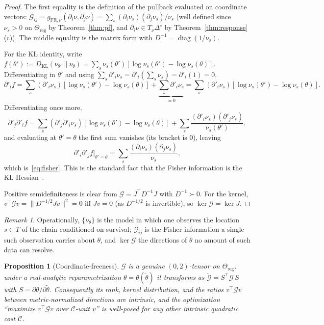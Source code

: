 \documentclass[11pt,reqno]{amsart}
\theoremstyle{plain}
\newtheorem{proposition}[theorem]{Proposition}
\theoremstyle{definition}
\theoremstyle{remark}
\newtheorem{remark}[theorem]{Remark}
\newcommand{\Reg}{\Theta_{\mathrm{reg}}}
\newcommand{\Simp}{\Delta^{\!\circ}}
\newcommand{\KL}{D_{\mathrm{KL}}}
\newcommand{\FR}{\mathrm{FR}}
\DeclareMathOperator{\diag}{diag}
\begin{document}
\begin{proof}
The first equality is the definition of the pullback evaluated on coordinate
vectors: $\mathcal G_{ij}=g_{\FR,\nu}(\partial_i\nu,\partial_j\nu)=\sum_s
(\partial_i\nu_s)(\partial_j\nu_s)/\nu_s$ (well defined since $\nu_s>0$ on $\Reg$ by
Theorem~\ref{thm:pf}, and $\partial_i\nu\in T_\nu\Simp$ by
Theorem~\ref{thm:response}(c)). The middle equality is the matrix form with
$D^{-1}=\diag(1/\nu_s)$.

For the KL identity, write $f(\theta'):=\KL(\nu_{\theta'}\|\nu_\theta)
=\sum_s\nu_s(\theta')[\log\nu_s(\theta')-\log\nu_s(\theta)]$. Differentiating in
$\theta'$ and using $\sum_s\partial'_i\nu_s=\partial'_i(\sum_s\nu_s)=\partial'_i(1)=0$,
\[
\partial'_if=\sum_s(\partial'_i\nu_s)[\log\nu_s(\theta')-\log\nu_s(\theta)]
+\underbrace{\sum_s\partial'_i\nu_s}_{=0}
=\sum_s(\partial'_i\nu_s)[\log\nu_s(\theta')-\log\nu_s(\theta)].
\]
Differentiating once more,
\[
\partial'_j\partial'_if=\sum_s(\partial'_j\partial'_i\nu_s)[\log\nu_s(\theta')-\log
\nu_s(\theta)]+\sum_s\frac{(\partial'_i\nu_s)(\partial'_j\nu_s)}{\nu_s(\theta')},
\]
and evaluating at $\theta'=\theta$ the first sum vanishes (its bracket is $0$),
leaving
\[
\partial'_i\partial'_jf\big|_{\theta'=\theta}=\sum_s\frac{(\partial_i\nu_s)(\partial_j\nu_s)}{\nu_s},
\]
which is~\eqref{eq:fisher}. This is the standard fact that the Fisher information is
the KL Hessian~\cite[\S2.4]{AmariNagaoka2000}.

Positive semidefiniteness is clear from $\mathcal G=J^\top D^{-1}J$ with
$D^{-1}\succ0$. For the kernel, $v^\top\mathcal G v=\|D^{-1/2}Jv\|^2=0$ iff
$Jv=0$ (as $D^{-1/2}$ is invertible), so $\ker\mathcal G=\ker J$.
\end{proof}

\begin{remark}\label{rem:operational}
Operationally, $\{\nu_\theta\}$ is the model in which one observes the location
$s\in T$ of the chain conditioned on survival; $\mathcal G_{ij}$ is the Fisher
information a single such observation carries about $\theta$, and $\ker\mathcal G$
the directions of $\theta$ no amount of such data can resolve.
\end{remark}

\begin{proposition}[Coordinate-freeness]\label{prop:coordinate-free}
$\mathcal G$ is a genuine $(0,2)$-tensor on $\Reg$: under a real-analytic
reparametrization $\theta=\theta(\tilde\theta)$ it transforms as
$\widetilde{\mathcal G}=S^{\top}\mathcal G\,S$ with $S=\partial\theta/\partial
\tilde\theta$. Consequently its rank, kernel distribution, and the ratios
$v^{\top}\mathcal G v$ between metric-normalized directions are intrinsic, and the
optimization ``maximize $v^{\top}\mathcal G v$ over $\mathcal C$-unit $v$'' is
well-posed for any other intrinsic quadratic cost $\mathcal C$.
\end{proposition}
\end{document}
